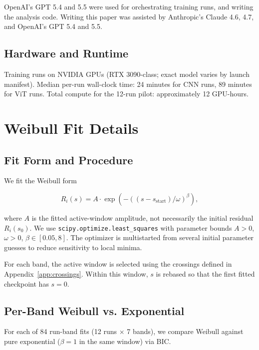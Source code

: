\documentclass{article}
\begin{document}
OpenAI's GPT 5.4 and 5.5 were used for orchestrating training runs,
and writing the analysis code. Writing this paper was assisted by
Anthropic's Claude 4.6, 4.7, and OpenAI's GPT 5.4 and 5.5.

\subsection{Hardware and Runtime}\label{app:hardware-runtime}

Training runs on NVIDIA GPUs (RTX 3090-class; exact model varies by
launch manifest). Median per-run wall-clock time: 24 minutes for CNN
runs, 89 minutes for ViT runs. Total compute for the 12-run pilot:
approximately 12 GPU-hours.

\section{Weibull Fit Details}\label{appendix:weibull-fit-details}

\subsection{Fit Form and Procedure}\label{app:fit-procedure}

We fit the Weibull form

\begin{equation}\label{eq:fit-form}
R_i(s) = A \cdot \exp\!\left(-((s - s_{\text{start}})/\omega)^\beta\right),
\end{equation}

where $A$ is the fitted active-window amplitude, not necessarily the
initial residual $R_i(s_0)$. We use \texttt{scipy.optimize.least\_squares}
with parameter bounds $A > 0$, $\omega > 0$, $\beta \in [0.05, 8]$. The optimizer
is multistarted from several initial parameter guesses to reduce
sensitivity to local minima.

For each band, the active window is selected using the crossings
defined in Appendix~\ref{app:crossings}. Within this window,
$s$ is rebased so that the first fitted checkpoint has \(s=0\).

\subsection{Per-Band Weibull vs. Exponential}\label{app:per-band-weibull-vs-exponential}

For each of 84 run-band fits (12 runs $\times$ 7 bands), we compare Weibull
against pure exponential ($\beta = 1$ in the same window) via BIC.
\end{document}
